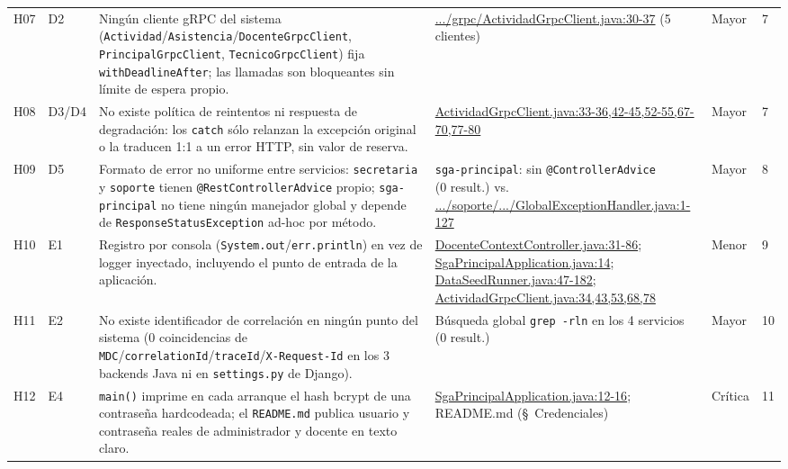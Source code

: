 \documentclass[11pt,a4paper]{article}
\begin{document}
{\begin{xltabular}{\textwidth}{@{}p{0.55cm}p{0.95cm}X p{3.5cm}p{1.05cm}p{0.6cm}@{}}
        H07 & D2 & Ning\'un cliente gRPC del sistema (\texttt{Actividad}/\texttt{Asistencia}/\texttt{DocenteGrpcClient}, \texttt{PrincipalGrpcClient}, \texttt{TecnicoGrpcClient}) fija \texttt{withDeadlineAfter}; las llamadas son bloqueantes sin l\'imite de espera propio. & {\raggedright\scriptsize\url{.../grpc/ActividadGrpcClient.java:30-37} (5 clientes)\par} & Mayor & 7 \\
        H08 & D3/D4 & No existe pol\'itica de reintentos ni respuesta de degradaci\'on: los \texttt{catch} s\'olo relanzan la excepci\'on original o la traducen 1:1 a un error HTTP, sin valor de reserva. & {\raggedright\scriptsize\url{ActividadGrpcClient.java:33-36,42-45,52-55,67-70,77-80}\par} & Mayor & 7 \\
        H09 & D5 & Formato de error no uniforme entre servicios: \texttt{secretaria} y \texttt{soporte} tienen \texttt{@RestControllerAdvice} propio; \texttt{sga-principal} no tiene ning\'un manejador global y depende de \texttt{ResponseStatusException} ad-hoc por m\'etodo. & {\raggedright\scriptsize \texttt{sga-principal}: sin \texttt{@ControllerAdvice}\newline (0 result.) vs.\newline \url{.../soporte/.../GlobalExceptionHandler.java:1-127}\par} & Mayor & 8 \\
        H10 & E1 & Registro por consola (\texttt{System.out}/\texttt{err.println}) en vez de logger inyectado, incluyendo el punto de entrada de la aplicaci\'on. & {\raggedright\scriptsize\url{DocenteContextController.java:31-86};\newline \url{SgaPrincipalApplication.java:14};\newline \url{DataSeedRunner.java:47-182};\newline \url{ActividadGrpcClient.java:34,43,53,68,78}\par} & Menor & 9 \\
        H11 & E2 & No existe identificador de correlaci\'on en ning\'un punto del sistema (0 coincidencias de \texttt{MDC}/\texttt{correlationId}/\texttt{traceId}/\texttt{X-Request-Id} en los 3 backends Java ni en \texttt{settings.py} de Django). & {\raggedright\scriptsize B\'usqueda global \texttt{grep -rln} en los 4 servicios (0 result.)\par} & Mayor & 10 \\
        H12 & E4 & \texttt{main()} imprime en cada arranque el hash bcrypt de una contrase\~na hardcodeada; el \texttt{README.md} publica usuario y contrase\~na reales de administrador y docente en texto claro. & {\raggedright\scriptsize\url{SgaPrincipalApplication.java:12-16}; README.md (\S\ Credenciales)\par} & Cr\'itica & 11 \\

\end{xltabular}}
\end{document}
